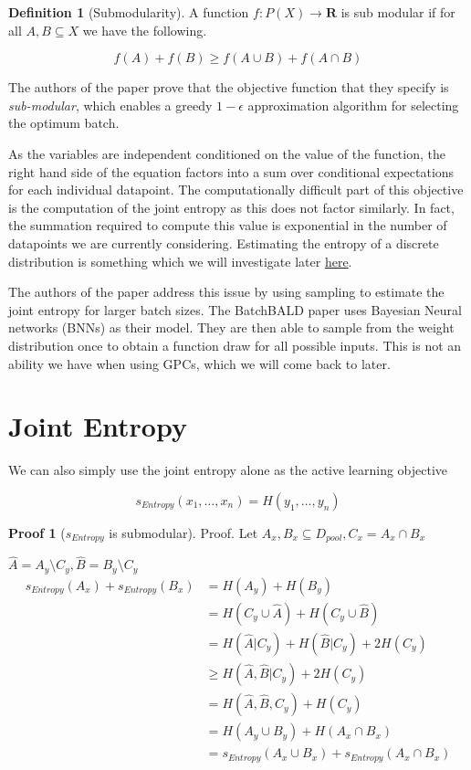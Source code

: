 \documentclass[12pt, a4paper]{report}
\theoremstyle{definition}
\theoremstyle{definition}
\newtheorem{definition}{Definition}[section]
\theoremstyle{definition}
\newtheorem{nproof}{Proof}[section]
\begin{document}
\begin{definition}[Submodularity]
    A function $f : P(X) \rightarrow \mathbf{R}$ is sub modular if for all $A,B \subseteq X$ we have the following.

    $$f(A) + f(B) \geq f\left( A \cup B \right) +  f\left(A \cap B \right) $$
\end{definition}

The authors of the paper prove that the objective function that they specify is \textit{sub-modular}, which enables a greedy $1 - \epsilon$ approximation algorithm for selecting the optimum batch.



As the variables are independent conditioned on the value of the function, the right hand side of the equation factors into a sum over conditional expectations for each individual datapoint. The computationally difficult part of this objective is the computation of the joint entropy as this does not factor similarly. In fact, the summation required to compute this value is exponential in the number of datapoints we are currently considering. Estimating the entropy of a discrete distribution is something which we will investigate later \hyperref[sec:Entropy]{here}.


The authors of the paper address this issue by using sampling to estimate the joint entropy for larger batch sizes. The BatchBALD paper uses Bayesian Neural networks (BNNs) as their model. They are then able to sample from the weight distribution once to obtain a function draw for all possible inputs. This is not an ability we have when using GPCs, which we will come back to later.


\section{Joint Entropy}

We can also simply use the joint entropy alone as the active learning objective

$$s_{Entropy} (x_1, \ldots, x_n) = H(y_1, \ldots, y_n)$$

\begin{nproof}[$s_{Entropy}$ is submodular]
    Proof.
    Let $A_x,B_x \subseteq D_{pool}, C_x = A_x \cap B_x$
    
    $\hat{A} = A_y \setminus C_y, \hat{B} = B_y \setminus C_y$
    \begin{align*}
        s_{Entropy} (A_x) + s_{Entropy} (B_x) &= H(A_y) + H(B_y)\\
        &= H(C_y \cup \hat{A}) + H(C_y \cup \hat{B})\\
        &= H(\hat{A} | C_y) + H(\hat{B} | C_y) + 2 H(C_y)\\
        &\geq H(\hat{A}, \hat{B} | C_y) + 2 H(C_y)\\
        &= H(\hat{A}, \hat{B}, C_y) + H(C_y)\\
        &= H(A_y \cup B_y) + H(A_x \cap B_x)\\
        &= s_{Entropy} (A_x \cup B_x) + s_{Entropy} (A_x \cap B_x)
    \end{align*}

\end{nproof}
\end{document}
